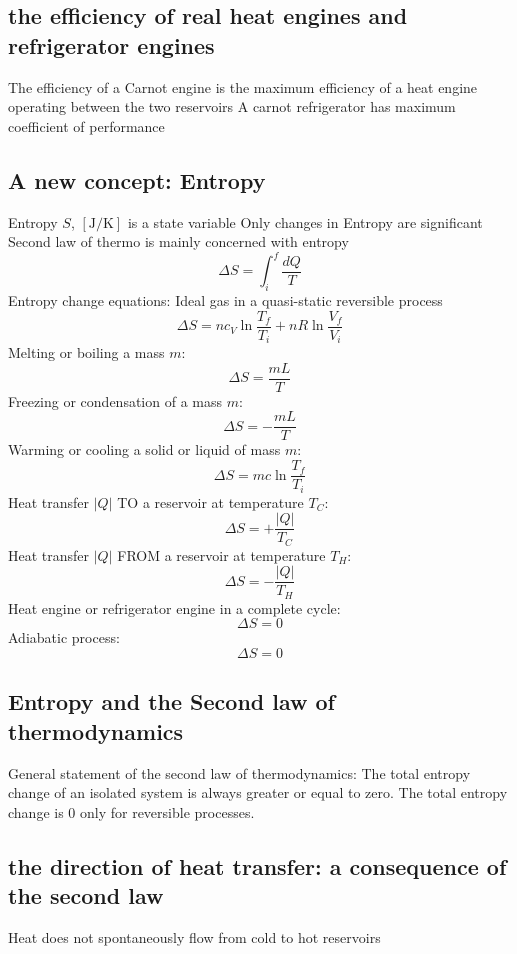 \documentclass{article}
\begin{document}
\subsection{the efficiency of real heat engines and refrigerator engines}
\begin{outline}
\1 The efficiency of a Carnot engine is the maximum efficiency of a heat engine operating between the two reservoirs
\1 A carnot refrigerator has maximum coefficient of performance
\end{outline}
\subsection{A new concept: Entropy}
\begin{outline}
\1 Entropy $S$, $[\text{J/K}]$ is a state variable
\1 Only changes in Entropy are significant
\1 Second law of thermo is mainly concerned with entropy
\0 \[\Delta S=\int_{i}^{f}\dfrac{dQ}{T}\]
\1 Entropy change equations: 
\2 Ideal gas in a quasi-static reversible process \[\Delta S=nc_V\ln\dfrac{T_f}{T_i}+nR\ln\dfrac{V_f}{V_i}\]
\2 Melting or boiling a mass $m$: \[\Delta S=\dfrac{mL}{T}\]
\2 Freezing or condensation of a mass $m$: \[\Delta S=-\dfrac{mL}{T}\]
\2 Warming or cooling a solid or liquid of mass $m$: \[\Delta S=mc\ln\dfrac{T_f}{T_i}\]
\2 Heat transfer $|Q|$ TO a reservoir at temperature $T_C$: \[\Delta S=+\dfrac{|Q|}{T_C}\]
\2 Heat transfer $|Q|$ FROM a reservoir at temperature $T_H$: \[\Delta S=-\dfrac{|Q|}{T_H}\]
\2 Heat engine or refrigerator engine in a complete cycle: \[\Delta S=0\]
\2 Adiabatic process: \[\Delta S=0\]
\end{outline}
\subsection{Entropy and the Second law of thermodynamics}
\begin{outline}
\1 General statement of the second law of thermodynamics: The total entropy change of an isolated system is always greater or equal to zero. The total entropy change is 0 only for reversible processes. 
\end{outline}
\subsection{the direction of heat transfer: a consequence of the second law}
\begin{outline}
\1 Heat does not spontaneously flow from cold to hot reservoirs
\end{outline}
\end{document}

